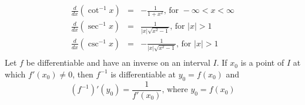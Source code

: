 \documentclass{article}
\begin{document}
\begin{itemize}
\begin{eqnarray}
        \frac{d}{dx}\left(\cot^{-1}{x}\right) &=& -\frac{1}{1 + x^2} \text{, for } -\infty < x < \infty \\
        \frac{d}{dx}\left(\sec^{-1}{x}\right) &=& \frac{1}{|x|\sqrt{x^2 - 1}} \text{, for } |x| > 1 \\
        \frac{d}{dx}\left(\csc^{-1}{x}\right) &=& -\frac{1}{|x|\sqrt{x^2 - 1}} \text{, for } |x| > 1 \\
    \end{eqnarray}
    Let $f$ be differentiable and have an inverse on an interval $I$. If $x_0$ is a point of $I$ at which $f'(x_0) \neq 0$, then $f^{-1}$ is differentiable at $y_0 = f(x_0)$ and
    $$\left(f^{-1}\right)'\left(y_0\right) = \frac{1}{f'\left(x_0\right)} \text{, where } y_0 = f\left(x_0\right)$$
\end{itemize}
\end{document}
